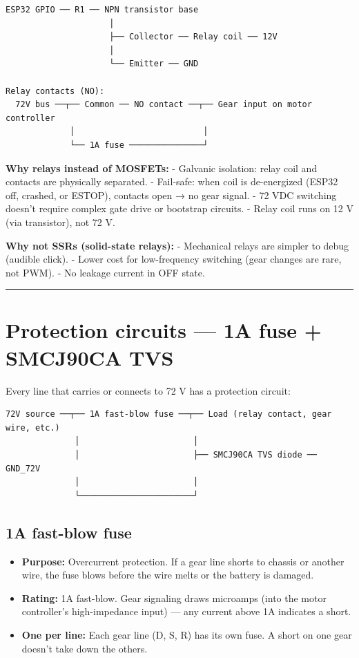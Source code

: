 \documentclass[12pt,a4paper,oneside]{report}
\providecommand{\tightlist}{\setlength{\itemsep}{0pt}\setlength{\parskip}{0pt}}
\begin{document}
\begin{verbatim}
ESP32 GPIO ── R1 ── NPN transistor base
                     │
                     ├── Collector ── Relay coil ── 12V
                     │
                     └── Emitter ── GND

Relay contacts (NO):
  72V bus ──┬── Common ── NO contact ──┬── Gear input on motor controller
             │                          │
             └── 1A fuse ───────────────┘
\end{verbatim}

\textbf{Why relays instead of MOSFETs:} - Galvanic isolation: relay coil and
contacts are physically separated. - Fail-safe: when coil is de-energized (ESP32
off, crashed, or ESTOP), contacts open → no gear signal. - 72 VDC switching
doesn't require complex gate drive or bootstrap circuits. - Relay coil runs on
12 V (via transistor), not 72 V.

\textbf{Why not SSRs (solid-state relays):} - Mechanical relays are simpler to
debug (audible click). - Lower cost for low-frequency switching (gear changes
are rare, not PWM). - No leakage current in OFF state.

\begin{center}\rule{0.5\linewidth}{0.5pt}\end{center}

\section{Protection circuits --- 1A fuse + SMCJ90CA
TVS}\label{protection-circuits-1a-fuse-smcj90ca-tvs}

Every line that carries or connects to 72 V has a protection circuit:

\begin{verbatim}
72V source ──┬── 1A fast-blow fuse ──┬── Load (relay contact, gear wire, etc.)
              │                       │
              │                       ├── SMCJ90CA TVS diode ── GND_72V
              │                       │
              └───────────────────────┘
\end{verbatim}

\subsection{1A fast-blow fuse}\label{a-fast-blow-fuse}

\begin{itemize}
\tightlist
\item
  \textbf{Purpose:} Overcurrent protection. If a gear line shorts to chassis or
  another wire, the fuse blows before the wire melts or the battery is damaged.
\item
  \textbf{Rating:} 1A fast-blow. Gear signaling draws microamps (into the motor
  controller's high-impedance input) --- any current above 1A indicates a short.
\item
  \textbf{One per line:} Each gear line (D, S, R) has its own fuse. A short on
  one gear doesn't take down the others.
\end{itemize}
\end{document}
